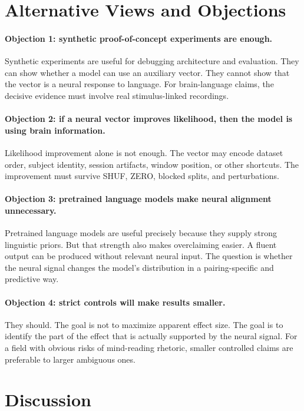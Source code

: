 \documentclass{article}
\begin{document}
\section{Alternative Views and Objections}

\paragraph{Objection 1: synthetic proof-of-concept experiments are enough.}
Synthetic experiments are useful for debugging architecture and evaluation.
They can show whether a model can use an auxiliary vector.
They cannot show that the vector is a neural response to language.
For brain-language claims, the decisive evidence must involve real stimulus-linked recordings.

\paragraph{Objection 2: if a neural vector improves likelihood, then the model is using brain information.}
Likelihood improvement alone is not enough.
The vector may encode dataset order, subject identity, session artifacts, window position, or other shortcuts.
The improvement must survive SHUF, ZERO, blocked splits, and perturbations.

\paragraph{Objection 3: pretrained language models make neural alignment unnecessary.}
Pretrained language models are useful precisely because they supply strong linguistic priors.
But that strength also makes overclaiming easier.
A fluent output can be produced without relevant neural input.
The question is whether the neural signal changes the model's distribution in a pairing-specific and predictive way.

\paragraph{Objection 4: strict controls will make results smaller.}
They should.
The goal is not to maximize apparent effect size.
The goal is to identify the part of the effect that is actually supported by the neural signal.
For a field with obvious risks of mind-reading rhetoric, smaller controlled claims are preferable to larger ambiguous ones.

\section{Discussion}
\end{document}
